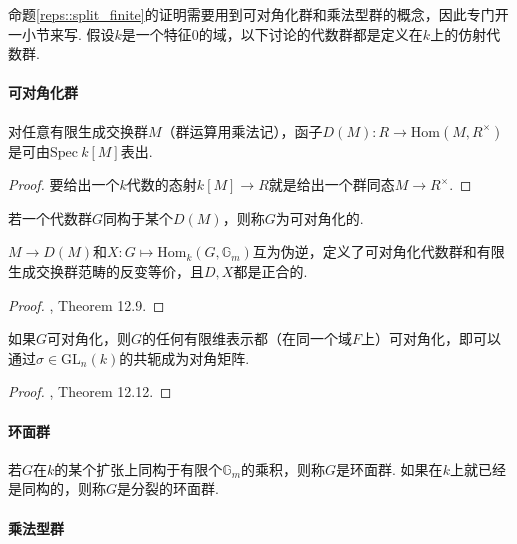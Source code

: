 命题\ref{reps::split_finite}的证明需要用到可对角化群和乘法型群的概念，因此专门开一小节来写.
假设$k$是一个特征$0$的域，以下讨论的代数群都是定义在$k$上的仿射代数群.

\paragraph*{可对角化群}

\begin{cprop}
    对任意有限生成交换群$M$（群运算用乘法记），函子$D(M): R\to \mathrm{Hom}(M, R^{\times})$是可由$\mathrm{Spec}\ k[M]$表出.
\end{cprop}

\begin{proof}
    要给出一个$k$代数的态射$k[M]\to R$就是给出一个群同态$M\to R^{\times}$.
\end{proof}

\begin{cdef}
    若一个代数群$G$同构于某个$D(M)$，则称$G$为可对角化的.
\end{cdef}

\begin{cprop}
    $M\to D(M)$和$X: G\mapsto \mathrm{Hom}_k(G, \mathbb{G}_m)$互为伪逆，定义了可对角化代数群和有限生成交换群范畴的反变等价，且$D,X$都是正合的.
\end{cprop}

\begin{proof}
    \cite{milne2017algebraic}, Theorem 12.9.
\end{proof}

\begin{cprop}
    如果$G$可对角化，则$G$的任何有限维表示都（在同一个域$F$上）可对角化，即可以通过$\sigma\in\mathrm{GL}_n(k)$的共轭成为对角矩阵.
\end{cprop}

\begin{proof}
    \cite{milne2017algebraic}, Theorem 12.12.
\end{proof}

\paragraph*{环面群}

\begin{cdef}
    若$G$在$k$的某个扩张上同构于有限个$\mathbb{G}_m$的乘积，则称$G$是环面群. 如果在$k$上就已经是同构的，则称$G$是分裂的环面群.
\end{cdef}

\paragraph*{乘法型群}

